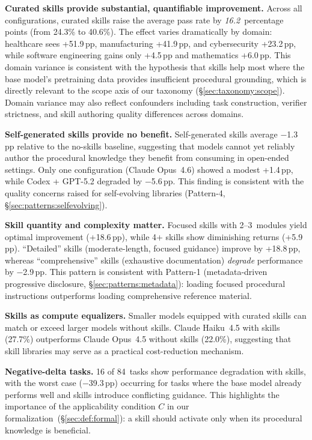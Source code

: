 \documentclass[conference, compsoc]{IEEEtran}
\theoremstyle{plain}
\newcommand{\para}[1]{\smallskip\noindent\textbf{#1.}}
\begin{document}
{\para{Curated skills provide substantial, quantifiable improvement} Across all configurations, curated skills raise the average pass rate by \textit{16.2}~percentage points (from 24.3\% to 40.6\%). The effect varies dramatically by domain: healthcare sees +51.9\,pp, manufacturing +41.9\,pp, and cybersecurity +23.2\,pp, while software engineering gains only +4.5\,pp and mathematics +6.0\,pp. This domain variance is consistent with the hypothesis that skills help most where the base model's pretraining data provides insufficient procedural grounding, which is directly relevant to the scope axis of our taxonomy (\S\ref{sec:taxonomy:scope}). Domain variance may also reflect confounders including task construction, verifier strictness, and skill authoring quality differences across domains.

\para{Self-generated skills provide no benefit} Self-generated skills average $-$1.3\,pp relative to the no-skills baseline, suggesting that models cannot yet reliably author the procedural knowledge they benefit from consuming in open-ended settings. Only one configuration (Claude Opus~4.6) showed a modest +1.4\,pp, while Codex + GPT-5.2 degraded by $-$5.6\,pp. This finding is consistent with the quality concerns raised for self-evolving libraries (Pattern-4, \S\ref{sec:patterns:selfevolving}).

\para{Skill quantity and complexity matter} Focused skills with 2--3~modules yield optimal improvement (+18.6\,pp), while 4+ skills show diminishing returns (+5.9\,pp).  ``Detailed'' skills (moderate-length, focused guidance) improve by +18.8\,pp, whereas ``comprehensive'' skills (exhaustive documentation) \emph{degrade} performance by $-$2.9\,pp. This pattern is consistent with Pattern-1 (metadata-driven progressive disclosure, \S\ref{sec:patterns:metadata}): loading focused procedural instructions outperforms loading comprehensive reference material.

\para{Skills as compute equalizers} Smaller models equipped with curated skills can match or exceed larger models without skills. Claude Haiku~4.5 with skills (27.7\%) outperforms Claude Opus~4.5 without skills (22.0\%), suggesting that skill libraries may serve as a practical cost-reduction mechanism.

\para{Negative-delta tasks} 16 of 84~tasks show performance degradation with skills, with the worst case ($-$39.3\,pp) occurring for tasks where the base model already performs well and skills introduce conflicting guidance. This highlights the importance of the applicability condition $C$ in our formalization~(\S\ref{sec:def:formal}): a skill should activate only when its procedural knowledge is beneficial.

}
\end{document}
